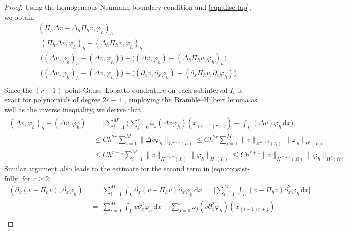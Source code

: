 \documentclass[a4paper, oneside]{book}
\def\d{{\mathrm{d}}}
\def\d{\mathrm{d}}
\def\II{(\Omega)}
\def\fy{\varphi}
\begin{document}
\begin{proof}
Using the homogeneous Neumann boundary condition
and  \eqref{eqn:disc-lap}, we obtain
\begin{equation}\label{eqn:consist-fully}
\begin{aligned}
  &\quad(\Pi_h \Delta v - \Delta_h \Pi_h v, \fy_h )_h \\
  &= (\Pi_h \Delta v , \fy_h )_h -  (\Delta_h \Pi_h v, \fy_h )_h\\
  &= \Big(( \Delta v , \fy_h )_h - ( \Delta v , \fy_h )\Big) +  \Big(( \Delta v , \fy_h ) -  (\Delta_h \Pi_h v, \fy_h )_h\Big)\\
    &= \Big(( \Delta v , \fy_h )_h - ( \Delta v , \fy_h )\Big) +  \Big(( \partial_x v , \partial_x \fy_h ) -  (\partial_x \Pi_h v, \partial_x \fy_h )\Big)\\
\end{aligned}
\end{equation}
Since the $(r + 1)$-point Gauss--Lobatto quadrature on each subinterval $I_i$ is exact for polynomials of degree
$2r - 1$ \cite[pp. 425]{Quarteroni:2000}, employing the Bramble--Hilbert lemma
as well as the inverse inequality, we derive that
\begin{align*}
|( \Delta v , \fy_h )_h - ( \Delta v , \fy_h ) | &= \Big|\sum_{i=1}^M \Big(\sum_{j=0}^{r} \omega_j  (\Delta v   \fy_h)(x_{(i-1)r+j}) - \int_{I_i} (\Delta v ) \fy_h \,\d x\Big) \Big|\\
&\le C h^{2r} \sum_{i=1}^M \| \Delta v   \fy_h  \|_{W^{2r,1}(I_i)} \le  C h^{2r} \sum_{i=1}^M \|   v  \|_{H^{2r+2}(I_i)}  \| \fy_h  \|_{H^{r}(I_i)}\\
&\le Ch^{r+1} \sum_{i=1}^M \|   v  \|_{H^{2r+2}(I_i)}  \| \fy_h  \|_{H^{1}(I_i)} \le Ch^{r+1}  \|   v  \|_{H^{2r+2}\II}  \| \fy_h  \|_{H^{1}\II}.
\end{align*}
Similar argument also leads to the estimate for the second term in \eqref{eqn:consist-fully} for $r\ge2$:
\begin{align*}
 |( \partial_x (v- \Pi_h v), \partial_x \fy_h )|
 &= \Big|\sum_{i=1}^M \int_{I_i}  \partial_x (v- \Pi_h v) \partial_x \fy_h \,\d x\Big|
 =\Big|\sum_{i=1}^M \int_{I_i}    (v- \Pi_h v) \partial_x^2 \fy_h \,\d x\Big|\\
& =\Big|\sum_{i=1}^M \int_{I_i}    v  \partial_x^2 \fy_h \,\d x - \sum_{j=0}^{r} \omega_j  (  v  \partial_x^2 \fy_h)(x_{(i-1)r+j}) \Big|\\

\end{align*}
\end{proof}
\end{document}
